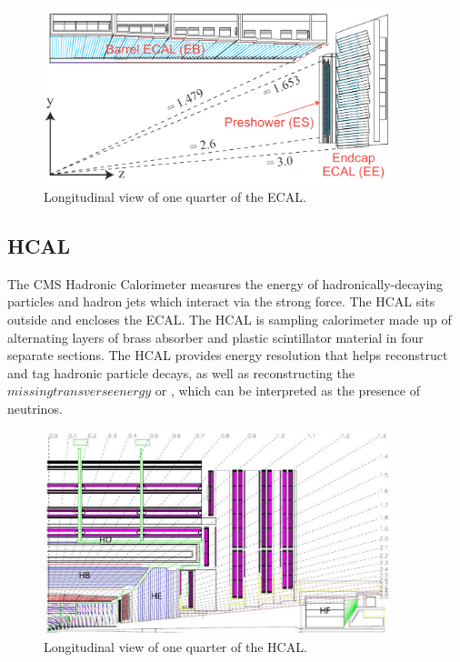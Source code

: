 \begin{figure}[hbtp]
 \begin{center}
   \includegraphics[width=0.9\textwidth]{ch3_figs/ecal_rapidity.pdf}
   \caption[Longitudinal view of the CMS ECAL]{Longitudinal view of one quarter of the ECAL.}
   \label{fig:cms_ecal}
 \end{center}
\end{figure}

\subsection{HCAL}
The CMS Hadronic Calorimeter measures the energy of hadronically-decaying particles and hadron jets which interact via the strong force. The HCAL sits outside and encloses the ECAL.
The HCAL is sampling calorimeter made up of alternating layers of brass absorber and plastic scintillator material in four separate sections. The HCAL provides energy resolution that helps reconstruct and tag hadronic
particle decays, as well as reconstructing the $missing transverse energy$ or \met, which can be interpreted as the presence of neutrinos. 

\begin{figure}[hbtp]
 \begin{center}
   \includegraphics[width=0.9\textwidth]{ch3_figs/hcal.pdf}
   \caption[Longitudinal view of the CMS HCAL]{Longitudinal view of one quarter of the HCAL.}
   \label{fig:cms_hcal}
 \end{center}
\end{figure}

